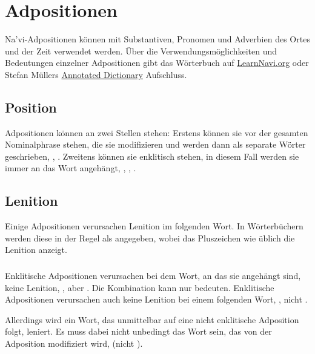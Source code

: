 \section{Adpositionen}
\noindent Na'vi-Adpositionen können mit Substantiven, Pronomen und Adverbien des Ortes und der Zeit verwendet werden. Über die Verwendungsmöglichkeiten und Bedeutungen einzelner Adpositionen gibt das Wörterbuch auf \href{https://learnnavi.org/navi-vocabulary/}{LearnNavi.org} oder Stefan Müllers \href{https://forum.learnnavi.org/index.php?msg=613941}{Annotated Dictionary} Aufschluss.

\subsection{Position} Adpositionen können an zwei Stellen stehen: Erstens können sie vor der gesamten Nominalphrase stehen, die sie modifizieren und werden dann als separate Wörter geschrieben,  ,  . Zweitens können sie enklitisch stehen, in diesem Fall werden sie immer an das Wort angehängt,  ,  ,  .
\label{syn:adp:position}

\subsection{Lenition} Einige Adpositionen verursachen Lenition im folgenden Wort. In Wörterbüchern werden diese in der Regel als  angegeben, wobei das Pluszeichen wie üblich die Lenition anzeigt.

\subsubsection{} Enklitische Adpositionen verursachen bei dem Wort, an das sie angehängt sind, keine Lenition,  , aber . Die Kombination  kann nur  bedeuten. Enklitische Adpositionen verursachen auch keine Lenition bei einem folgenden Wort,  , nicht .

Allerdings wird ein Wort, das unmittelbar auf eine nicht enklitische Adposition folgt, leniert. Es muss dabei nicht unbedingt das Wort sein, das von der Adposition modifiziert wird,   (nicht ).

